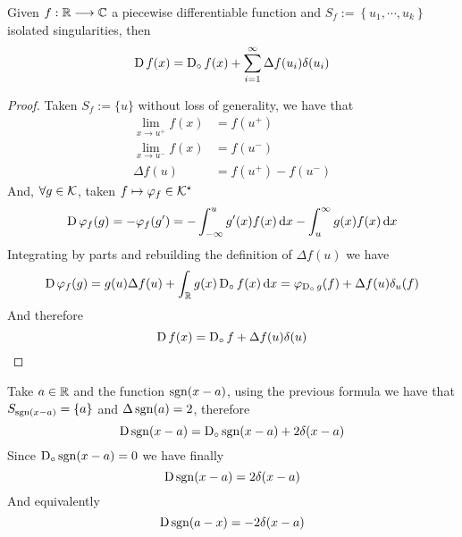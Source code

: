 \documentclass[../complete.tex]{subfiles}
\begin{document}
\begin{thm}
	Given $f:\mathbb{R}\overset{}{\longrightarrow}\mathbb{C}$ a piecewise differentiable function and $S_f:=\left\{ u_1,\cdots,u_k \right\}$ isolated singularities, then
	\begin{equation*}
		\operatorname{\mathrm{D}} f(x)=\operatorname{D_{\circ}} f(x)+\sum_{i=1}^\infty\Delta f(u_i)\delta(u_i)
	\end{equation*}
\end{thm}
\begin{proof}
	Taken $S_f:=\{u\}$ without loss of generality, we have that
	\begin{equation*}
		\begin{aligned}
			\lim_{x\to u^+}f(x)&=f(u^+)\\
			\lim_{x\to u^-}f(x)&=f(u^-)\\
			\Delta f(u)&=f(u^+)-f(u^-)
		\end{aligned}
	\end{equation*}
	And, $\forall g\in\mathcal{K}$, taken $f\mapsto\varphi_f\in\mathcal{K}^\star$
	\begin{equation*}
		\operatorname{\mathrm{D}}\varphi_f(g)=-\varphi_f(g')=-\int_{-\infty}^{u}g'(x)f(x)\operatorname{d\!} x-\int_{u}^{\infty}g(x)f(x)\operatorname{d\!} x
	\end{equation*}
	Integrating by parts and rebuilding the definition of $\Delta f(u)$ we have
	\begin{equation*}
		\operatorname{\mathrm{D}}\varphi_f(g)=g(u)\Delta f(u)+\int_{\mathbb{R}}^{}g(x)\operatorname{D_{\circ}} f(x)\operatorname{d\!} x=\varphi_{\operatorname{D_{\circ}} g}(f)+\Delta f(u)\delta_u(f)
	\end{equation*}
	And therefore
	\begin{equation*}
		\operatorname{\mathrm{D}} f(x)=\operatorname{D_{\circ}} f+\Delta f(u)\delta(u)
	\end{equation*}
\end{proof}
\begin{eg}
	Take $a\in\mathbb{R}$ and the function $\operatorname{sgn}(x-a)$, using the previous formula we have that $S_{\operatorname{sgn}(x-a)}=\{a\}$ and $\Delta\operatorname{sgn}(a)=2$, therefore
	\begin{equation*}
		\operatorname{\mathrm{D}}\operatorname{sgn}(x-a)=\operatorname{D_{\circ}}\operatorname{sgn}(x-a)+2\delta(x-a)
	\end{equation*}
	Since $\operatorname{D_{\circ}}\operatorname{sgn}(x-a)=0$ we have finally
	\begin{equation*}
		\operatorname{\mathrm{D}}\operatorname{sgn}(x-a)=2\delta(x-a)
	\end{equation*}
	And equivalently
	\begin{equation*}
		\operatorname{\mathrm{D}}\operatorname{sgn}(a-x)=-2\delta(x-a)
	\end{equation*}
\end{eg}
\end{document}
